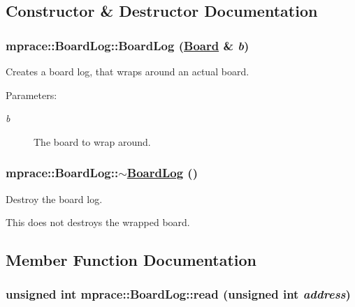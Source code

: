 \subsection{Constructor \& Destructor Documentation}
\hypertarget{classmprace_1_1BoardLog_a0}{
\subsubsection[BoardLog]{\setlength{\rightskip}{0pt plus 5cm}mprace::Board\-Log::Board\-Log (\hyperlink{classmprace_1_1Board}{Board} \& {\em b})}}
\label{classmprace_1_1BoardLog_a0}


Creates a board log, that wraps around an actual board. 

\begin{Desc}
\item[Parameters:]
\begin{description}
\item[{\em b}]The board to wrap around.\end{description}
\end{Desc}
\hypertarget{classmprace_1_1BoardLog_a1}{
\subsubsection[$\sim$BoardLog]{\setlength{\rightskip}{0pt plus 5cm}mprace::Board\-Log::$\sim$\hyperlink{classmprace_1_1BoardLog}{Board\-Log} ()}}
\label{classmprace_1_1BoardLog_a1}


Destroy the board log. 

This does not destroys the wrapped board.

\subsection{Member Function Documentation}
\hypertarget{classmprace_1_1BoardLog_a3}{
\subsubsection[read]{\setlength{\rightskip}{0pt plus 5cm}unsigned int mprace::Board\-Log::read (unsigned int {\em address})}}
\label{classmprace_1_1BoardLog_a3}


